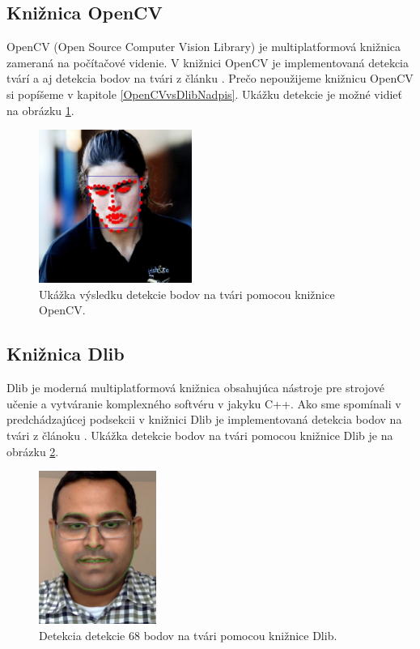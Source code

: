 \subsection{Knižnica OpenCV}
OpenCV\cite{openCv} (Open Source Computer Vision Library) je multiplatformová knižnica zameraná na počítačové videnie.
V knižnici OpenCV je implementovaná detekcia tvárí a aj detekcia bodov na tvári z článku \cite{kazemi2014one}. 
Prečo nepoužijeme knižnicu OpenCV si popíšeme v kapitole \ref{OpenCVvsDlibNadpis}. 
Ukážku detekcie je možné vidieť na obrázku \ref{pic-openCv}. 

\begin{figure}[H]
	\begin{center}
		\includegraphics[height=5cm]{pics/openCv.jpg}
		\caption{Ukážka výsledku detekcie bodov na tvári pomocou knižnice OpenCV.
		 \cite{openCv}}
		\label{pic-openCv}
	\end{center}
\end{figure}

\subsection{Knižnica Dlib} \label{DlibNadpis}
Dlib\cite{dlib} je moderná multiplatformová knižnica obsahujúca nástroje pre strojové učenie a vytváranie komplexného softvéru v jakyku C++. 
Ako sme spomínali v pred\-chá\-dza\-jú\-cej podsekcii v knižnici Dlib je implementovaná detekcia bodov na tvári z článoku \cite{kazemi2014one}. 
Ukážka detekcie bodov na tvári pomocou knižnice Dlib je na obrázku \ref{pic-dlibUkazka}.

\begin{figure}[H]
	\begin{center}
		\includegraphics[height=5cm]{pics/dlib.jpg}
		\caption{Detekcia detekcie 68 bodov na tvári pomocou knižnice Dlib.
		 \cite{dlibUkazka}}
		\label{pic-dlibUkazka}
	\end{center}
\end{figure}


